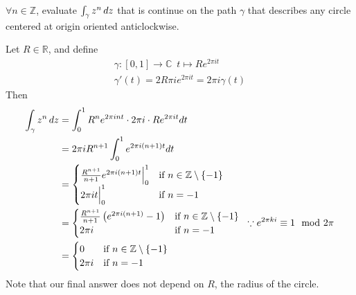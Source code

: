 \documentclass[11pt, oneside]{book}
\begin{document}
\begin{eg}\label{eg:integral_of_path_on_a_circle}
	$\forall n \in \mathbb{Z}$, evaluate $\int_{\gamma} z^n \mathop{}\!d{z}$ that is continue on the path $\gamma$ that describes any circle centered at origin oriented anticlockwise.

	\begin{solution}
		Let $R \in \mathbb{R}$, and define
		\begin{gather*}
			\gamma: [0, 1] \to \mathbb{C} \enspace t \mapsto Re^{2\pi i t} \\
			\gamma'(t) = 2R\pi i e^{2\pi i t} = 2 \pi i \gamma(t)
		\end{gather*}
		Then
		\begin{align*}
			\int_{\gamma} z^n \mathop{}\!d{z}
				&= \int_{0}^{1} R^ne^{2 \pi i n t} \cdot 2 \pi i \cdot Re^{2 \pi i t} dt \\
				&= 2 \pi i R^{n + 1} \int_{0}^{1} e^{2 \pi i (n + 1) t} dt \\
				&= \begin{cases}
					\frac{R^{n + 1}}{n + 1} e^{2 \pi i (n + 1) t} \Big|_{0}^{1} & \text{if } n \in \mathbb{Z} \setminus \{-1\} \\
					2 \pi i t \Big|_{0}^{1} & \text{if } n = -1
				\end{cases} \\
				&= \begin{cases}
					\frac{R^{n + 1}}{n + 1} \left(e^{2 \pi i (n + 1)} - 1 \right) & \text{if } n \in \mathbb{Z} \setminus \{-1\} \\
					2 \pi i 	& \text{if } n = -1
				\end{cases} \enspace \because e^{2 \pi k i} \equiv 1 \mod 2 \pi\\
				&= \begin{cases}
					0	& \text{if } n \in \mathbb{Z} \setminus \{-1\} \\
					2 \pi i & \text{if } n = -1
				\end{cases}
		\end{align*}
		Note that our final answer does not depend on $R$, the radius of the circle.
	\end{solution}
\end{eg}
\end{document}
